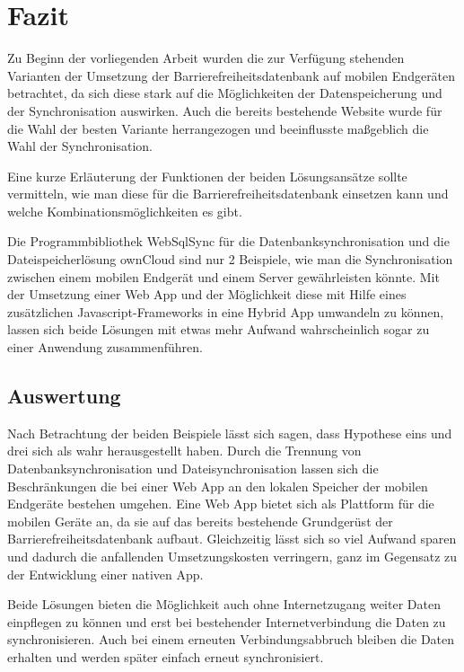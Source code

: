 %
\chapter{Fazit}
\label{sec:Fazit}

Zu Beginn der vorliegenden Arbeit wurden die zur Verfügung stehenden Varianten der Umsetzung der Barrierefreiheitsdatenbank auf mobilen Endgeräten betrachtet, da sich diese stark auf die Möglichkeiten der Datenspeicherung und der Synchronisation auswirken. Auch die bereits bestehende Website wurde für die Wahl der besten Variante herrangezogen und beeinflusste maßgeblich die Wahl der Synchronisation.

Eine kurze Erläuterung der Funktionen der beiden Lösungsansätze sollte vermitteln, wie man diese für die Barrierefreiheitsdatenbank einsetzen kann und welche Kombinationsmöglichkeiten es gibt.

Die Programmbibliothek WebSqlSync für die Datenbanksynchronisation und die Dateispeicherlösung ownCloud sind nur 2 Beispiele, wie man die Synchronisation zwischen einem mobilen Endgerät und einem Server gewährleisten könnte. Mit der Umsetzung einer Web App und der Möglichkeit diese mit Hilfe eines zusätzlichen Javascript-Frameworks in eine Hybrid App umwandeln zu können, lassen sich beide Lösungen mit etwas mehr Aufwand wahrscheinlich sogar zu einer Anwendung zusammenführen.

\section{Auswertung}
\label{sec:Fazit:Auswertung}

Nach Betrachtung der beiden Beispiele lässt sich sagen, dass Hypothese eins und drei sich als wahr herausgestellt haben. Durch die Trennung von Datenbanksynchronisation und Dateisynchronisation lassen sich die Beschränkungen die bei einer Web App an den lokalen Speicher der mobilen Endgeräte bestehen umgehen. Eine Web App bietet sich als Plattform für die mobilen Geräte an, da sie auf das bereits bestehende Grundgerüst der Barrierefreiheitsdatenbank aufbaut. Gleichzeitig lässt sich so viel Aufwand sparen und dadurch die anfallenden Umsetzungskosten verringern, ganz im Gegensatz zu der Entwicklung einer nativen App.

Beide Lösungen bieten die Möglichkeit auch ohne Internetzugang weiter Daten einpflegen zu können und erst bei bestehender Internetverbindung die Daten zu synchronisieren. Auch bei einem erneuten Verbindungsabbruch bleiben die Daten erhalten und werden später einfach erneut synchronisiert.

